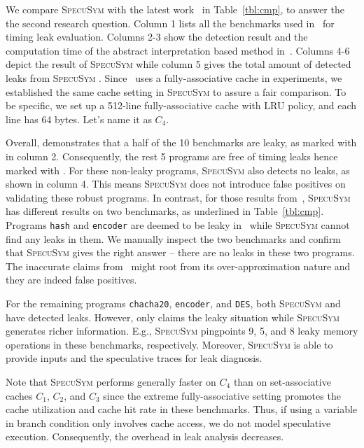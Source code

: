 \documentclass[sigconf, review]{acmart}
\newcommand{\SpecuSym}{\textsc{SpecuSym} }
\begin{document}
We compare \SpecuSym with the latest work~\cite{WuW19} in Table~\ref{tbl:cmp}, 
to answer the the second research question. Column 1 lists all the benchmarks 
used in~\cite{WuW19} for timing leak evaluation. Columns 2-3 show the detection 
result and the computation time of the abstract interpretation based method 
in~\cite{WuW19}. Columns 4-6 depict the result of \SpecuSym while column 5 
gives the total amount of detected leaks from \SpecuSym. Since~\cite{WuW19} 
uses a fully-associative cache in experiments, we established the same cache 
setting in \SpecuSym to assure a fair comparison. To be specific, we set up 
a 512-line fully-associative cache with LRU policy, and each line has 64 bytes. 
Let's name it as $C_4$.



Overall, \cite{WuW19} demonstrates that a half of the 10 benchmarks are leaky, 
as marked with  in column 2. Consequently, the rest 5 programs are 
free of timing leaks hence marked with . For these non-leaky programs, 
\SpecuSym also detects no leaks, as shown in column 4. This means \SpecuSym does 
not introduce false positives on validating these robust programs. In contrast, 
for those  results from~\cite{WuW19}, \SpecuSym has different results 
on two benchmarks, as underlined in Table~\ref{tbl:cmp}. Programs \texttt{hash} 
and \texttt{encoder} are deemed to be leaky in~\cite{WuW19} while \SpecuSym 
cannot find any leaks in them. We manually inspect the two benchmarks and confirm 
that \SpecuSym gives the right answer -- there are no leaks in these two programs. 
The inaccurate claims from~\cite{WuW19} might root from its over-approximation 
nature and they are indeed false positives.


For the remaining programs \texttt{chacha20}, \texttt{encoder}, and \texttt{DES}, 
both \SpecuSym and~\cite{WuW19} have detected leaks. However, \cite{WuW19} only 
claims the leaky situation while \SpecuSym generates richer information. E.g., 
\SpecuSym pingpoints 9, 5, and 8 leaky memory operations in these benchmarks, 
respectively. Moreover, \SpecuSym is able to provide inputs and the speculative 
traces for leak diagnosis.


Note that \SpecuSym performs generally faster on $C_4$ than on set-associative 
caches $C_1$, $C_2$, and $C_3$ since the extreme fully-associative setting 
promotes the cache utilization and cache hit rate in these benchmarks. Thus, if 
using a variable in branch condition only involves cache access, we do not model 
speculative execution. Consequently, the overhead in leak analysis decreases.
\end{document}
